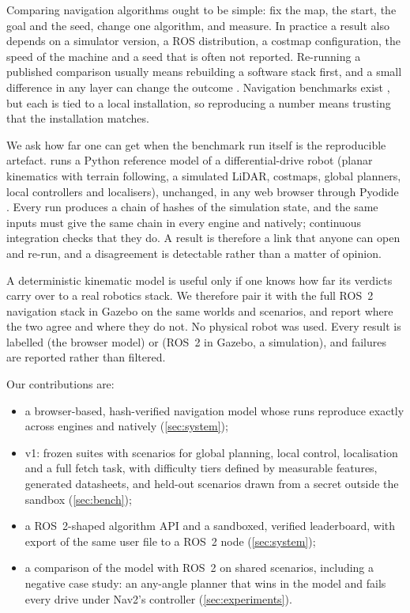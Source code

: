 Comparing navigation algorithms ought to be simple: fix the map, the start, the goal and the seed,
change one algorithm, and measure. In practice a result also depends on a simulator version, a ROS
distribution, a costmap configuration, the speed of the machine and a seed that is often not
reported. Re-running a published comparison usually means rebuilding a software stack first, and a
small difference in any layer can change the outcome \cite{bonsignorio2015replicable}. Navigation
benchmarks exist \cite{perille2020barn,wen2020mrpb,heiden2021benchmr,kastner2022arenabench}, but
each is tied to a local installation, so reproducing a number means trusting that the installation
matches.

We ask how far one can get when the benchmark run itself is the reproducible artefact. \bench{}
runs a Python reference model of a differential-drive robot (planar kinematics with terrain
following, a simulated LiDAR, costmaps, global planners, local controllers and localisers),
unchanged, in any web browser through Pyodide \cite{pyodide}. Every run produces a chain of hashes
of the simulation state, and the same inputs must give the same chain in every engine and natively;
continuous integration checks that they do. A result is therefore a link that anyone can open and
re-run, and a disagreement is detectable rather than a matter of opinion.

A deterministic kinematic model is useful only if one knows how far its verdicts carry over to a
real robotics stack. We therefore pair it with the full ROS~2 navigation stack
\cite{macenski2022ros2,macenski2020marathon} in Gazebo \cite{koenig2004gazebo} on the same worlds and
scenarios, and report where the two agree and where they do not. No physical robot was used. Every
result is labelled  (the browser model) or  (ROS~2 in Gazebo, a
simulation), and failures are reported rather than filtered.

Our contributions are:
\begin{itemize}
\item a browser-based, hash-verified navigation model whose runs reproduce exactly across
  \DetEngines{} engines and natively (\cref{sec:system});
\item \bench{} v1: \BenchSuites{} frozen suites with \BenchScenarios{} scenarios for global planning,
  local control, localisation and a full fetch task, with difficulty tiers defined by measurable
  features, generated datasheets, and held-out scenarios drawn from a secret outside the sandbox
  (\cref{sec:bench});
\item a ROS~2-shaped algorithm API and a sandboxed, verified leaderboard, with export of the same
  user file to a ROS~2 node (\cref{sec:system});
\item a comparison of the model with ROS~2 on shared scenarios, including a negative case study: an
  any-angle planner that wins in the model and fails every drive under Nav2's controller
  (\cref{sec:experiments}).
\end{itemize}
